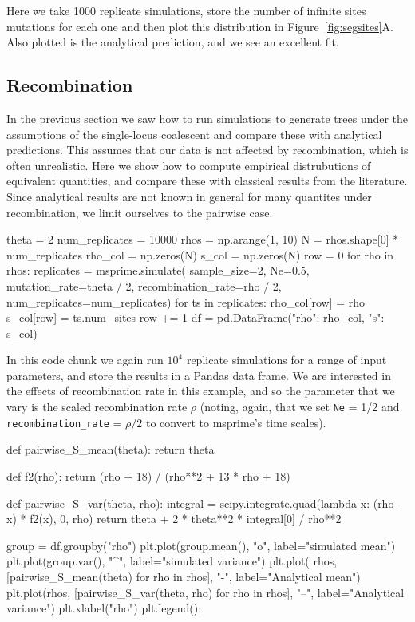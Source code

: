 \documentclass[graybox]{svmult}
\begin{document}
Here we take 1000 replicate simulations, store the number of infinite
sites mutations for each one and then plot this distribution in
Figure~\ref{fig:segsites}A. Also plotted is the analytical prediction,
and we see an excellent fit.


\subsection{Recombination}

In the previous section we saw how to run simulations to generate trees
under the assumptions of the single-locus coalescent and compare these
with analytical predictions. This assumes that our data is not affected
by recombination, which is often unrealistic. Here we show how to
compute empirical distrubutions of equivalent quantities, and compare
these with classical results from the literature. Since analytical
results are not known in general for many quantites under recombination,
we limit ourselves to the pairwise case.

\begin{pythoncode}
theta = 2
num_replicates = 10000
rhos = np.arange(1, 10)
N = rhos.shape[0] * num_replicates
rho_col = np.zeros(N)
s_col = np.zeros(N)
row = 0
for rho in rhos:
    replicates = msprime.simulate(
        sample_size=2, Ne=0.5, mutation_rate=theta / 2,
        recombination_rate=rho / 2, num_replicates=num_replicates)
    for ts in replicates:
        rho_col[row] = rho
        s_col[row] = ts.num_sites
        row += 1
df = pd.DataFrame({"rho": rho_col, "s": s_col})
\end{pythoncode}

In this code chunk we again run $10^4$ replicate simulations for a range
of input parameters, and store the results in a Pandas data frame. We
are interested in the effects of recombination rate in this example,
and so the parameter that we vary is the scaled recombination rate
$\rho$ (noting, again, that we set \texttt{Ne} = 1/2 and
\texttt{recombination\_rate} = $\rho / 2$ to convert to msprime's
time scales).

\begin{pythoncode}
def pairwise_S_mean(theta):
    return theta

def f2(rho):
    return (rho + 18) / (rho**2 + 13 * rho + 18)

def pairwise_S_var(theta, rho):
    integral = scipy.integrate.quad(lambda x: (rho - x) * f2(x), 0, rho)
    return theta + 2 * theta**2 * integral[0] / rho**2

group = df.groupby("rho")
plt.plot(group.mean(), "o", label="simulated mean")
plt.plot(group.var(), "^", label="simulated variance")
plt.plot(
    rhos, [pairwise_S_mean(theta) for rho in rhos], "-",
    label="Analytical mean")
plt.plot(rhos, [pairwise_S_var(theta, rho) for rho in rhos], "--",
label="Analytical variance")
plt.xlabel("rho")
plt.legend();
\end{pythoncode}
\end{document}

